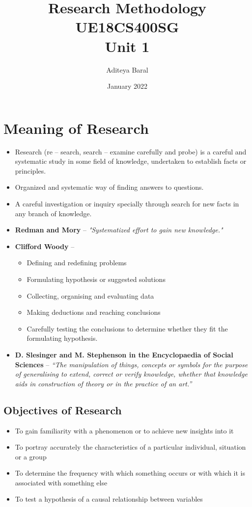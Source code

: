\documentclass{article}
\title{Research Methodology UE18CS400SG \\ Unit 1}
\author{Aditeya Baral}
\date{January 2022}
\begin{document}
\maketitle

\section{Meaning of Research}

\begin{itemize}
    \item Research (re -- search, search -- examine carefully and probe) is a careful and systematic study in some field of knowledge, undertaken to establish facts or principles.
    \item Organized and systematic way of finding answers to questions.
    \item A careful investigation or inquiry specially through search for new
facts in any branch of knowledge.
    \item \textbf{Redman and Mory} -- \textit{"Systematized effort to gain new knowledge."}
    \item \textbf{Clifford Woody} --
    \begin{itemize}
        \item Defining and redefining problems
        \item Formulating hypothesis or suggested solutions
        \item Collecting, organising and evaluating data
        \item Making deductions and reaching conclusions
        \item Carefully testing the conclusions to determine whether they fit the
formulating hypothesis.
    \end{itemize}
    \item \textbf{D. Slesinger and M. Stephenson in the Encyclopaedia of Social
Sciences} -- \textit{“The manipulation of things, concepts or symbols for the purpose of generalising to extend, correct or verify knowledge, whether that
knowledge aids in construction of theory or in the practice of an art.”}
\end{itemize}

\subsection{Objectives of Research}

\begin{itemize}
    \item To gain familiarity with a phenomenon or to achieve new insights into it
    \item To portray accurately the characteristics of a particular individual,
situation or a group
    \item To determine the frequency with which something occurs or with which
it is associated with something else
    \item To test a hypothesis of a causal relationship between variables
\end{itemize}
\end{document}

